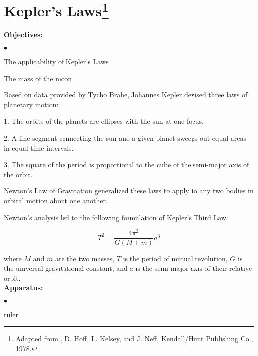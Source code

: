
\section{Kepler's Laws\footnote{
Adapted from , D. Hoff, L. Kelsey, and J.
Neff, Kendall/Hunt Publishing Co., 1978.
}}

\makelabheader %

{\noindent \bf Objectives:} \begin{list}{$\bullet$}{\itemsep0pt }

\item The applicability of Kepler's Laws \item The mass of the moon

\end{list}


\noindent Based on data provided by Tycho Brahe, Johannes Kepler devised three laws of planetary motion:

1. The orbits of the planets are ellipses with the sun at one focus.

2. A line segment connecting the sun and a given planet sweeps out equal areas in equal time intervals.

3. The square of the period is proportional to the cube of the semi-major axis of the orbit.

\noindent Newton's Law of Gravitation generalized these laws to apply to any two bodies in orbital motion about one another.

\noindent Newton's analysis led to the following formulation of Kepler's Third Law:

\begin{equation} T^2 = \frac{4\pi^2}{G(M + m)}a^3 \end{equation}

\noindent where $M$ and $m$ are the two masses, $T$ is the period of mutual revolution, $G$ is the universal gravitational constant, and $a$ is the semi-major axis of their relative orbit. \\

{\noindent \bf Apparatus:} \begin{list}{$\bullet$}{\itemsep0pt }

\item ruler

\end{list}

